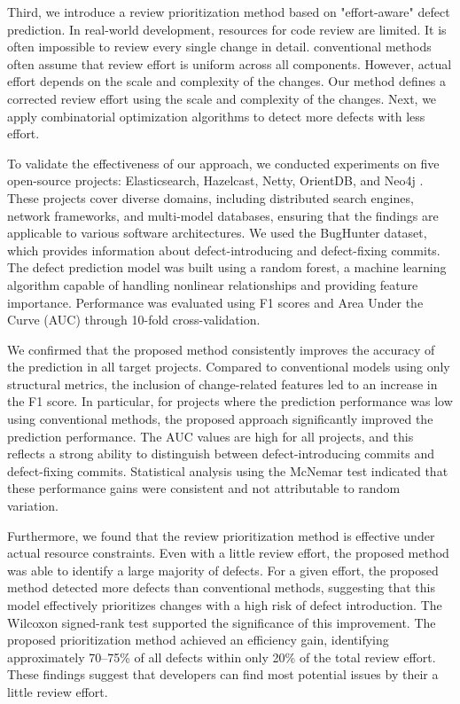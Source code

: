 Third, we introduce a review prioritization method based on "effort-aware" defect prediction. In real-world development, resources for code review are limited. It is often impossible to review every single change in detail. conventional methods often assume that review effort is uniform across all components. However, actual effort depends on the scale and complexity of the changes. Our method defines a corrected review effort using the scale and complexity of the changes. Next, we apply combinatorial optimization algorithms to detect more defects with less effort.

To validate the effectiveness of our approach, we conducted experiments on five open-source projects: Elasticsearch, Hazelcast, Netty, OrientDB, and Neo4j . These projects cover diverse domains, including distributed search engines, network frameworks, and multi-model databases, ensuring that the findings are applicable to various software architectures. We used the BugHunter dataset, which provides information about defect-introducing and defect-fixing commits. The defect prediction model was built using a random forest, a machine learning algorithm capable of handling nonlinear relationships and providing feature importance. Performance was evaluated using F1 scores and Area Under the Curve (AUC) through 10-fold cross-validation.

We confirmed that the proposed method consistently improves the accuracy of the prediction in all target projects. Compared to conventional models using only structural metrics, the inclusion of change-related features led to an increase in the F1 score. In particular, for projects where the prediction performance was low using conventional methods, the proposed approach significantly improved the prediction performance. The AUC values are high for all projects, and this reflects a strong ability to distinguish between defect-introducing commits and defect-fixing commits. Statistical analysis using the McNemar test indicated that these performance gains were consistent and not attributable to random variation.

Furthermore, we found that the review prioritization method is effective under actual resource constraints. Even with a little review effort, the proposed method was able to identify a large majority of defects. For a given effort, the proposed method detected more defects than conventional methods, suggesting that this model effectively prioritizes changes with a high risk of defect introduction. The Wilcoxon signed-rank test supported the significance of this improvement. The proposed prioritization method achieved an efficiency gain, identifying approximately 70–75\% of all defects within only 20\% of the total review effort. These findings suggest that developers can find most potential issues by their a little review effort.

